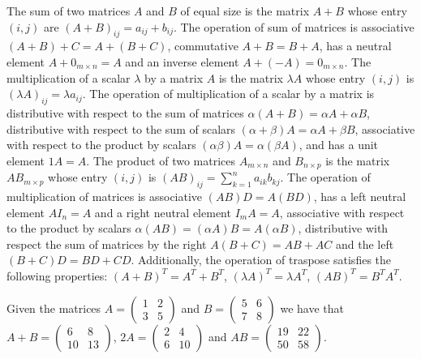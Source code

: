 The sum of two matrices $A$ and $B$ of equal size is the matrix $A + B$ whose entry $(i, j)$ are $(A + B)_{ij} = a_{ij} + b_{ij}$. The operation of sum of matrices is associative $(A + B) + C = A + (B + C)$, commutative $A + B = B + A$, has a neutral element $A + 0_{m \times n} = A$ and an inverse element $A + (-A) = 0_{m \times n}$. The multiplication of a scalar $\lambda$ by a matrix $A$ is the matrix $\lambda A$ whose entry $(i, j)$ is $(\lambda A)_{ij} = \lambda a_{ij}$. The operation of multiplication of a scalar by a matrix is distributive with respect to the sum of matrices $\alpha (A + B) = \alpha A + \alpha B$, distributive with respect to the sum of scalars $(\alpha + \beta) A = \alpha A + \beta B$, associative with respect to the product by scalars $(\alpha \beta) A = \alpha (\beta A)$, and has a unit element $1 A = A$. The product of two matrices $A_{m \times n}$ and $B_{n \times p}$ is the matrix $AB_{m \times p}$ whose entry $(i, j)$ is $(AB)_{ij} = \sum_{k=1}^n a_{ik} b_{kj}$. The operation of multiplication of matrices is associative $(A B) D = A (B D)$, has a left neutral element $A I_n = A$ and a right neutral element $I_m A = A$, associative with respect to the product by scalars $\alpha (A B) = (\alpha A) B = A (\alpha B)$, distributive with respect the sum of matrices by the right $A (B + C) = AB + AC$ and the left $(B + C) D = B D + C D$. Additionally, the operation of traspose satisfies the following properties: $(A + B)^T = A^T + B^T$, $(\lambda A)^T = \lambda A^T$, $(A B)^T = B^T A^T$.

\begin{example}
Given the matrices $A = \left( \begin{smallmatrix} 1 & 2 \\ 3 & 5 \end{smallmatrix} \right)$ and $B = \left( \begin{smallmatrix} 5 & 6 \\ 7 & 8 \end{smallmatrix} \right)$ we have that $A + B = \left( \begin{smallmatrix} 6 & 8 \\ 10 & 13 \end{smallmatrix} \right)$, $2 A = \left( \begin{smallmatrix} 2 & 4 \\ 6 & 10 \end{smallmatrix} \right)$ and $A B = \left( \begin{smallmatrix} 19 & 22 \\ 50 & 58 \end{smallmatrix} \right)$.
\end{example}


